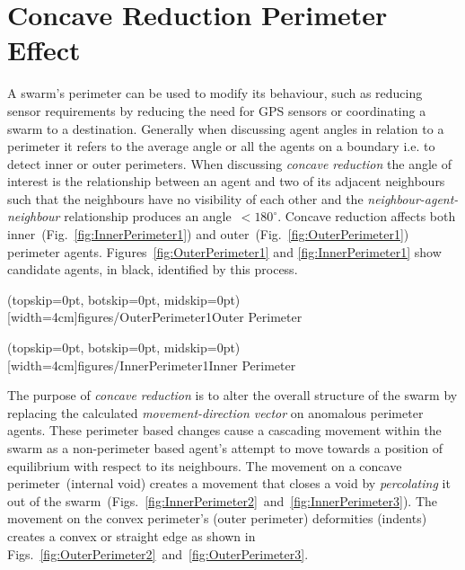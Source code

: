 \documentclass{ieeeaccess}
\begin{document}
\section{Concave Reduction Perimeter Effect}\label{sec:ConcaveReductionPerimeterEffect}
A swarm's perimeter can be used to modify its behaviour, such as reducing sensor requirements by reducing the need for GPS sensors or coordinating a swarm to a destination. Generally when discussing agent angles in relation to a perimeter it refers to the average angle or all the agents on a boundary i.e. to detect inner or outer perimeters. When discussing \textit{concave reduction} the angle of interest is the relationship between an agent and two of its adjacent neighbours such that the neighbours have no visibility of each other and the \textit{neighbour-agent-neighbour} relationship produces an angle~$< 180^\circ$. Concave reduction affects both inner~(Fig.~\ref{fig:InnerPerimeter1}) and outer~(Fig.~\ref{fig:OuterPerimeter1}) perimeter agents. Figures~\ref{fig:OuterPerimeter1} and \ref{fig:InnerPerimeter1} show candidate agents, in black, identified by this process. 

\Figure[t!](topskip=0pt, botskip=0pt, midskip=0pt)[width=4cm]{figures/OuterPerimeter1}{Outer Perimeter\label{fig:OuterPerimeter1}}

\Figure[t!](topskip=0pt, botskip=0pt, midskip=0pt)[width=4cm]{figures/InnerPerimeter1}{Inner Perimeter\label{fig:InnerPerimeter1}}

The purpose of \textit{concave reduction} is to alter the overall structure of the swarm by replacing the calculated \textit{movement-direction vector} on anomalous perimeter agents. These perimeter based changes cause a cascading movement within the swarm as a non-perimeter based agent's attempt to move towards a position of equilibrium with respect to its neighbours. The movement on a concave perimeter~(internal void) creates a movement that closes a void by \textit{percolating} it out of the swarm~(Figs.~\ref{fig:InnerPerimeter2}~and~\ref{fig:InnerPerimeter3}). The movement on the convex perimeter's (outer perimeter) deformities (indents) creates a convex or straight edge as shown in Figs.~\ref{fig:OuterPerimeter2}~and~\ref{fig:OuterPerimeter3}.
\end{document}
